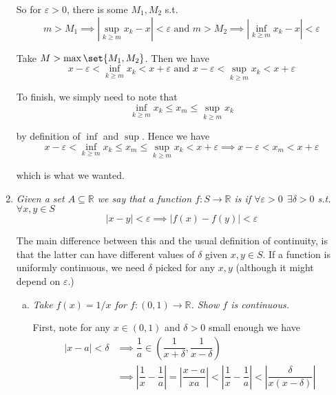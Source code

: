 \documentclass{article}
\begin{document}
\begin{enumerate}[1.]
    So for $\varepsilon > 0$, there is some $M_1, M_2$ s.t.
    \[
      m > M_1 \implies |\sup_{k \ge m} x_k - x| < \varepsilon
      \text{ and }
      m > M_2 \implies |\inf_{k \ge m} x_k - x| < \varepsilon
    \]

    Take $M > \max\set{M_1, M_2}$. Then we have
    \[
      x - \varepsilon < \inf_{k \ge m} x_k < x + \varepsilon
      \text{ and }
      x - \varepsilon < \sup_{k \ge m} x_k < x + \varepsilon
    \]

    To finish, we simply need to note that
    \[
      \inf_{k \ge m} x_k \le x_m \le \sup_{k \ge m} x_k
    \]

    by definition of $\inf$ and $\sup$. Hence we have
    \[
      x - \varepsilon < \inf_{k \ge m} x_k \le x_m \le \sup_{k \ge m} x_k < x + \varepsilon
      \implies
      x - \varepsilon < x_m < x + \varepsilon
    \]

    which is what we wanted.

  \item {\itshape
    Given a set $A \subseteq \mathbb{R}$ we say that a function $f: S \to \mathbb{R}$ is  if $\forall \varepsilon > 0 ~~ \exists \delta > 0$ s.t. $\forall x, y \in S$
    \[
      |x - y| < \varepsilon \implies |f(x) - f(y)| < \varepsilon
    \]

    The main difference between this and the usual definition of continuity, is that the latter can have different values of $\delta$ given $x, y \in S$. If a function is uniformly continuous, we need $\delta$ picked for any $x, y$ (although it might depend on $\varepsilon$.)}
    \begin{enumerate}[a)]
      \item \textit{Take $f(x) = 1 / x$ for $f: (0, 1) \to \mathbb{R}$. Show $f$ is continuous.}

        \solution First, note for any $x \in (0, 1)$ and $\delta > 0$ small enough we have
        \begin{align*}
            |x - a| < \delta
            &
            \implies
            \dfrac{1}{a}
            \in
            \left(
              \dfrac{1}{x + \delta},
              \dfrac{1}{x - \delta}
            \right)
            \\
            &
            \implies
            \left|\dfrac{1}{x} - \dfrac{1}{a}\right|
            =
            \left|\dfrac{x - a}{xa}\right|
            <
            \left|\dfrac{1}{x} - \dfrac{1}{a}\right|
            <
            \left|\dfrac{\delta}{x (x - \delta)}\right|
        \end{align*}


\end{enumerate}
\end{enumerate}
\end{document}
